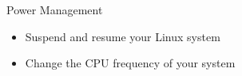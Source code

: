 \setuplabframe
{Power Management}
{
  \begin{itemize}
  \item Suspend and resume your Linux system
  \item Change the CPU frequency of your system
  \end{itemize}
}
